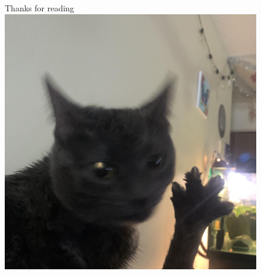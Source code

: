 \documentclass{report}
\begin{document}
\newpage
\begin{figure}
	\centering
	\Huge{Thanks for reading}
	\includegraphics[scale=0.2]{dabloon}
	\label{fig:dabloonia}
\end{figure}
\end{document}
